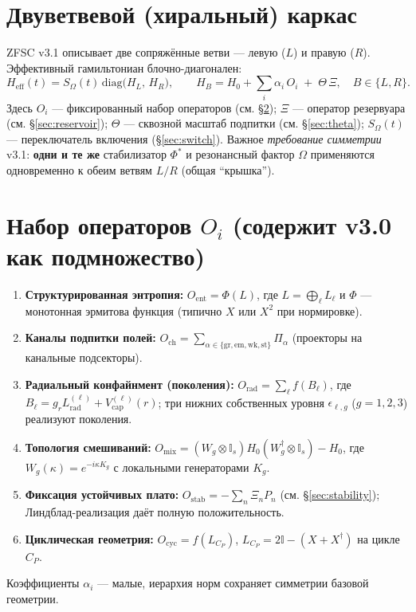 \documentclass[a4paper,12pt]{article}
\def\Omega{Ω}%
\def\Xi{Ξ}%
\def\Theta{Θ}%
\def\Phi{Φ}%
\def\Pi{Π}%
\newcommand{\Id}{\mathbb{I}}
\begin{document}
\section{Двуветвевой (хиральный) каркас}\label{sec:dual}
ZFSC v3.1 описывает две сопряжённые ветви --- левую ($L$) и правую ($R$). Эффективный гамильтониан блочно-диагонален:
\begin{equation}
H_{\mathrm{eff}}(t)=S_{\Omega}(t)\,
\mathrm{diag}\!\Big(H_L,\,H_R\Big),
\qquad
H_B = H_0 + \sum_i \alpha_i\,O_i \;+\; \Theta\,\Xi,\quad B\in\{L,R\}.
\label{eq:Heff31}
\end{equation}
Здесь $O_i$ --- фиксированный набор операторов (см. \S\ref{sec:operators}); $\Xi$ --- оператор резервуара (см. \S\ref{sec:reservoir}); $\Theta$ --- сквозной масштаб подпитки (см. \S\ref{sec:theta}); $S_{\Omega}(t)$ --- переключатель включения (\S\ref{sec:switch}). Важное \emph{требование симметрии} v3.1: \textbf{одни и те же} стабилизатор $\Phi^*$ и резонансный фактор $\Omega$ применяются одновременно к обеим ветвям $L/R$ (общая ``крышка'').

\section[Набор операторов Oi (содержит v3.0 как подмножество)]{Набор операторов \(O_i\) (содержит v3.0 как подмножество)}\label{sec:operators}
\begin{enumerate}
\item \textbf{Структурированная энтропия:} $O_{\mathrm{ent}}=\Phi(L)$, где $L=\bigoplus_\ell L_\ell$ и $\Phi$ --- монотонная эрмитова функция (типично $X$ или $X^2$ при нормировке).
\item \textbf{Каналы подпитки полей:} $O_{\mathrm{ch}}=\sum_{\alpha\in\{\mathrm{gr,em,wk,st}\}}\Pi_\alpha$ (проекторы на канальные подсекторы).
\item \textbf{Радиальный конфайнмент (поколения):} $O_{\mathrm{rad}}=\sum_\ell f(B_\ell)$, где $B_\ell=g_r L^{(\ell)}_{\mathrm{rad}}+V^{(\ell)}_{\mathrm{cap}}(r)$; три нижних собственных уровня $\epsilon_{\ell,g}$ ($g=1,2,3$) реализуют поколения.
\item \textbf{Топология смешиваний:} $O_{\mathrm{mix}}=(W_g\!\otimes\!\Id_s)H_0(W_g^\dagger\!\otimes\!\Id_s)-H_0$, где $W_g(\kappa)=e^{-i\kappa K_g}$ с локальными генераторами $K_g$.
\item \textbf{Фиксация устойчивых плато:} $O_{\mathrm{stab}}=-\sum_n \Xi_n P_n$ (см. \S\ref{sec:stability}); Линдблад-реализация даёт полную положительность.
\item \textbf{Циклическая геометрия:} $O_{\mathrm{cyc}}=f(L_{C_P})$, $L_{C_P}=2\Id-(X+X^\dagger)$ на цикле $C_P$.
\end{enumerate}
Коэффициенты $\alpha_i$ --- малые, иерархия норм сохраняет симметрии базовой геометрии.
\end{document}
